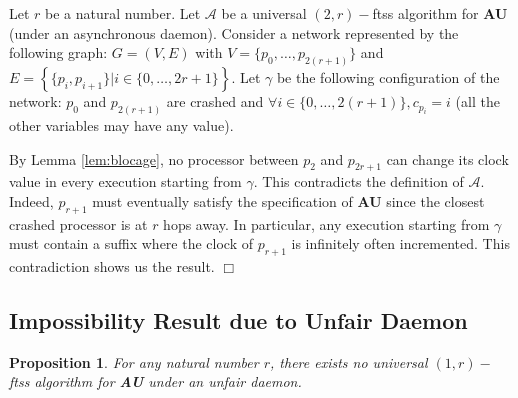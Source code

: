\documentclass[11pt,english,letterpaper]{article}
\newtheorem{proposition}{Proposition}
\newenvironment{proof}{{\noindent\bf Proof. } }{{\hfill $\Box$}}
\begin{document}
\begin{proof}
Let $r$ be a natural number. Let $\mathcal{A}$ be a universal $(2,r)-$ftss algorithm for \textbf{AU} (under an asynchronous daemon). Consider a network represented by the following graph: $G=(V,E)$ with $V=\{p_{0},\ldots,p_{2(r+1)}\}$ and $E=\left\{\{p_{i},p_{i+1}\}|i\in\{0,\ldots,2r+1\}\right\}$.	Let $\gamma$ be the following configuration of the network: $p_{0}$ and $p_{2(r+1)}$ are crashed and $\forall i\in\{0,\ldots,2(r+1)\},c_{p_{i}}=i$ 		(all the other variables may have any value).

By Lemma \ref{lem:blocage}, no processor between $p_{2}$ and $p_{2r+1}$ can change its clock value in every execution starting from $\gamma$. This contradicts the definition of $\mathcal{A}$. Indeed, $p_{r+1}$ must eventually satisfy the specification of \textbf{AU} since the closest crashed processor is at $r$ hops away. In particular, any execution starting from $\gamma$ must contain a suffix where the clock of $p_{r+1}$ is infinitely often incremented. This contradiction shows us the result.
\end{proof}

\subsection{Impossibility Result due to Unfair Daemon}

\begin{proposition}\label{prop:impUF}
For any natural number $r$, there exists no universal $(1,r)-$ftss algorithm for \textbf{AU} under an unfair daemon.
\end{proposition}
\end{document}
